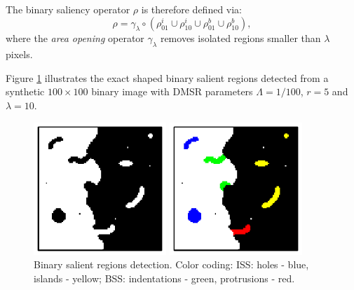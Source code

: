 \documentclass[conference,compsoc]{IEEEtran}
\newcommand {\be}{\begin{equation}}
\newcommand {\ee}{\end{equation}}
\def\S{{\mathbf S}}
\begin{document}
The binary saliency operator $\rho$ is therefore defined via:
\be
\rho = \gamma_\lambda \circ (\rho^i_{01} \cup\rho^i_{10} \cup
\rho^b_{01} \cup \rho^b_{10}),
\ee
where the  {\em area opening} operator  $\gamma_{\lambda}$ removes isolated regions smaller than $\lambda$ pixels.

 Figure \ref{fig:binary_sal} illustrates the exact shaped binary salient 
regions detected from a synthetic $100 \times 100$ binary image with DMSR parameters $\Lambda=1/100$, $r=5$ and $\lambda = 10$. 

\begin{figure}[htb]
\vspace{-0.2cm}
\begin{minipage}[b]{.49\linewidth}
  \centering
  \centerline{\includegraphics[width=5cm]{binary_marks}}

\end{minipage}
\begin{minipage}[b]{0.49\linewidth}
  \centering
  \centerline{\includegraphics[width=5cm]{binary_marks_clean_color_coded}}

\end{minipage}
\vspace{-0.3cm}
\caption{Binary salient regions detection.
Color coding: ISS: holes - blue, islands - yellow; BSS:
indentations - green, protrusions - red.}
\label{fig:binary_sal}
\end{figure}
\end{document}
